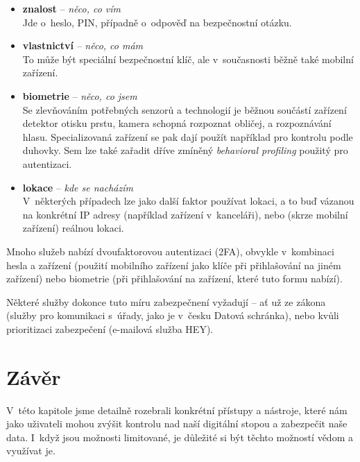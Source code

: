 \begin{itemize}
	\item \textbf{znalost} -- \textit{něco, co vím}\\ 
		Jde o~heslo, PIN, případně o~odpověď na bezpečnostní otázku.
	\item \textbf{vlastnictví} -- \textit{něco, co mám}\\
		To může být speciální bezpečnostní klíč, ale v~současnosti běžně také mobilní zařízení. 
	\item \textbf{biometrie} -- \textit{něco, co jsem}\\
		Se zlevňováním potřebných senzorů a technologií je běžnou součástí zařízení detektor otisku prstu, kamera schopná rozpoznat obličej, a rozpoznávání hlasu. Specializovaná zařízení se pak dají použít například pro kontrolu podle duhovky. Sem lze také zařadit dříve zmíněný \textit{behavioral profiling} použitý pro autentizaci.
	\item \textbf{lokace} -- \textit{kde se nacházím}\\
		V~některých případech lze jako další faktor používat lokaci, a to buď vázanou na konkrétní IP adresy (například zařízení v~kanceláři), nebo (skrze mobilní zařízení) reálnou lokaci.  
\end{itemize} 

Mnoho služeb nabízí dvoufaktorovou autentizaci (2FA), obvykle v~kombinaci hesla a zařízení (použití mobilního zařízení jako klíče při přihlašování na jiném zařízení) nebo biometrie (při přihlašování na zařízení, které tuto formu nabízí).

Některé služby dokonce tuto míru zabezpečnení vyžadují -- ať už ze zákona (služby pro komunikaci s~úřady, jako je v~česku Datová schránka), nebo kvůli prioritizaci zabezpečení (e-mailová služba HEY).



\section*{Závěr}
V~této kapitole jsme detailně rozebrali konkrétní přístupy a nástroje, které nám jako uživateli mohou zvýšit kontrolu nad naší digitální stopou a zabezpečit naše data. I~když jsou možnosti limitované, je důležité si být těchto možností vědom a využívat je. 
